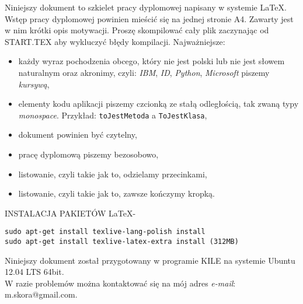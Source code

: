 \thispagestyle{empty}
Niniejszy dokument to szkielet pracy dyplomowej napisany w systemie \LaTeX.
Wstęp pracy dyplomowej powinien mieścić się na jednej stronie A4. Zawarty jest w nim krótki opis motywacji. 
Proszę skompilować cały plik zaczynając od START.TEX aby wykluczyć błędy kompilacji.
Najważniejsze:
\begin{itemize}
 \item każdy wyraz pochodzenia obcego, który nie jest polski lub nie jest słowem naturalnym oraz akronimy, czyli: \emph{IBM}, \emph{ID}, \emph{Python}, \emph{Microsoft} piszemy \emph{kursywą},
 \item elementy kodu aplikacji piszemy czcionką ze stałą odległością, tak zwaną typy \emph{monospace}. Przykład: \texttt{toJestMetoda} a \texttt{ToJestKlasa},
 \item dokument powinien być czytelny,
 \item pracę dyplomową piszemy bezosobowo,
 \item listowanie, czyli takie jak to, odzielamy przecinkami, 
 \item listowanie, czyli takie jak to, zawsze kończymy kropką.
\end{itemize}

INSTALACJA PAKIETÓW \LaTeX - \\
\begin{verbatim}
sudo apt-get install texlive-lang-polish install 
sudo apt-get install texlive-latex-extra install (312MB)
\end{verbatim}

Niniejszy dokument został przygotowany w programie KILE na systemie Ubuntu 12.04 LTS 64bit.\\
W razie problemów można kontaktować się na mój adres \emph{e-mail}: m.skora@gmail.com.
